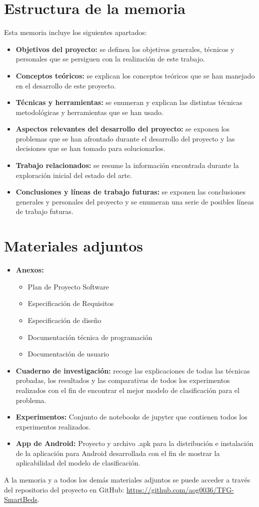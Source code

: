 \section{Estructura de la memoria}

Esta memoria incluye los siguientes apartados: 

\begin{itemize}
	\item \textbf{Objetivos del proyecto:} se definen los objetivos generales, técnicos y personales que se persiguen con la realización de este trabajo. 
	\item \textbf{Conceptos teóricos:} se explican los conceptos teóricos que se han manejado en el desarrollo de este proyecto. 
	\item \textbf{Técnicas y herramientas:} se enumeran y explican las distintas técnicas metodológicas y herramientas que se han usado. 
	\item \textbf{Aspectos relevantes del desarrollo del proyecto:} se exponen los problemas que se han afrontado durante el desarrollo del proyecto y las decisiones que se han tomado para solucionarlos. 
	\item \textbf{Trabajo relacionados:} se resume la información encontrada durante la exploración inicial del estado del arte. 
	\item \textbf{Conclusiones y líneas de trabajo futuras:} se exponen las conclusiones generales y personales del proyecto y se enumeran una serie de posibles líneas de trabajo futuras. 
\end{itemize}

\section{Materiales adjuntos}

\begin{itemize}	
	\item \textbf{Anexos:}
	\begin{itemize}
		\item Plan de Proyecto Software 
		\item Especificación de Requisitos
		\item Especificación de diseño
		\item Documentación técnica de programación 
		\item Documentación de usuario 
	\end{itemize}
	\item \textbf{Cuaderno de investigación:} recoge las explicaciones de todas las técnicas probadas, los resultados y las comparativas de todos los experimentos realizados con el fin de encontrar el mejor modelo de clasificación para el problema. 
	\item \textbf{Experimentos:} Conjunto de notebooks de jupyter que contienen todos los experimentos realizados. 
	\item \textbf{App de Android:} Proyecto y archivo .apk para la distribución e instalación de la aplicación para Android desarrollada con el fin de mostrar la aplicabilidad del modelo de clasificación. 
\end{itemize}

A la memoria y a todos los demás materiales adjuntos se puede acceder a través del repositorio del proyecto en GitHub: \url{https://github.com/aog0036/TFG-SmartBeds}. 


